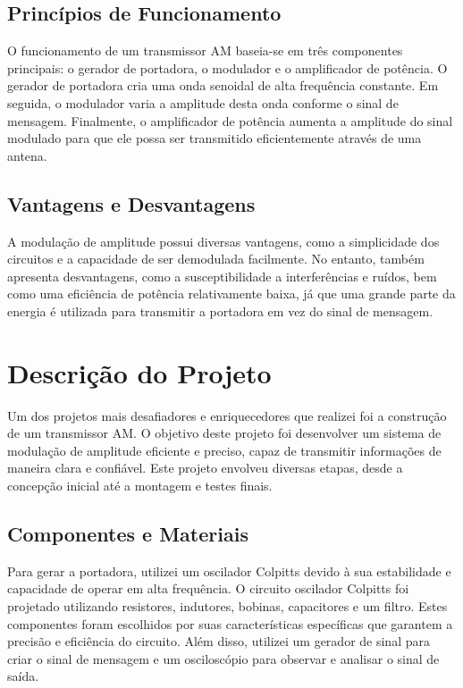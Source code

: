 \documentclass[
]{book}
\begin{document}
\subsection{Princípios de Funcionamento}\label{princuxedpios-de-funcionamento}

O funcionamento de um transmissor AM baseia-se em três componentes principais: o gerador de portadora, o modulador e o amplificador de potência. O gerador de portadora cria uma onda senoidal de alta frequência constante. Em seguida, o modulador varia a amplitude desta onda conforme o sinal de mensagem. Finalmente, o amplificador de potência aumenta a amplitude do sinal modulado para que ele possa ser transmitido eficientemente através de uma antena.

\subsection{Vantagens e Desvantagens}\label{vantagens-e-desvantagens}

A modulação de amplitude possui diversas vantagens, como a simplicidade dos circuitos e a capacidade de ser demodulada facilmente. No entanto, também apresenta desvantagens, como a susceptibilidade a interferências e ruídos, bem como uma eficiência de potência relativamente baixa, já que uma grande parte da energia é utilizada para transmitir a portadora em vez do sinal de mensagem.

\section{Descrição do Projeto}\label{descriuxe7uxe3o-do-projeto}

Um dos projetos mais desafiadores e enriquecedores que realizei foi a construção de um transmissor AM. O objetivo deste projeto foi desenvolver um sistema de modulação de amplitude eficiente e preciso, capaz de transmitir informações de maneira clara e confiável. Este projeto envolveu diversas etapas, desde a concepção inicial até a montagem e testes finais.

\subsection{Componentes e Materiais}\label{componentes-e-materiais}

Para gerar a portadora, utilizei um oscilador Colpitts devido à sua estabilidade e capacidade de operar em alta frequência. O circuito oscilador Colpitts foi projetado utilizando resistores, indutores, bobinas, capacitores e um filtro. Estes componentes foram escolhidos por suas características específicas que garantem a precisão e eficiência do circuito. Além disso, utilizei um gerador de sinal para criar o sinal de mensagem e um osciloscópio para observar e analisar o sinal de saída.
\end{document}
